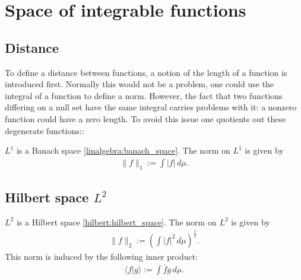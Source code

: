 \section{Space of integrable functions}
\subsection{Distance}

    To define a distance between functions, a notion of the length of a function is introduced first. Normally this would not be a problem, one could use the integral of a function to define a norm. However, the fact that two functions differing on a null set have the same integral carries problems with it: a nonzero function could have a zero length. To avoid this issue one quotients out these degenerate functions::
    \begin{property}
        $L^1$ is a Banach space \ref{linalgebra:banach_space}. The norm on $L^1$ is given by
        \begin{gather}
            \label{lebesgue:L1_norm}
            \|f\|_1 := \int|f|\,d\mu.
        \end{gather}
    \end{property}

\subsection{Hilbert space \texorpdfstring{$L^2$}{L2}}\label{lebesgue:section:hilbert_space}

    \begin{property}\label{lebesgue:L2_hilbert_space}
        $L^2$ is a Hilbert space \ref{hilbert:hilbert_space}. The norm on $L^2$ is given by
        \begin{gather}
            \label{lebesgue:L2_norm}
            \|f\|_2 := \left(\int|f|^2\,d\mu\right)^{\frac{1}{2}}.
        \end{gather}
        This norm is induced by the following inner product:
        \begin{gather}
            \label{lebesgue:L2_inner_product}
            \langle f|g \rangle := \int\overline{f}g\,d\mu.
        \end{gather}
    \end{property}

